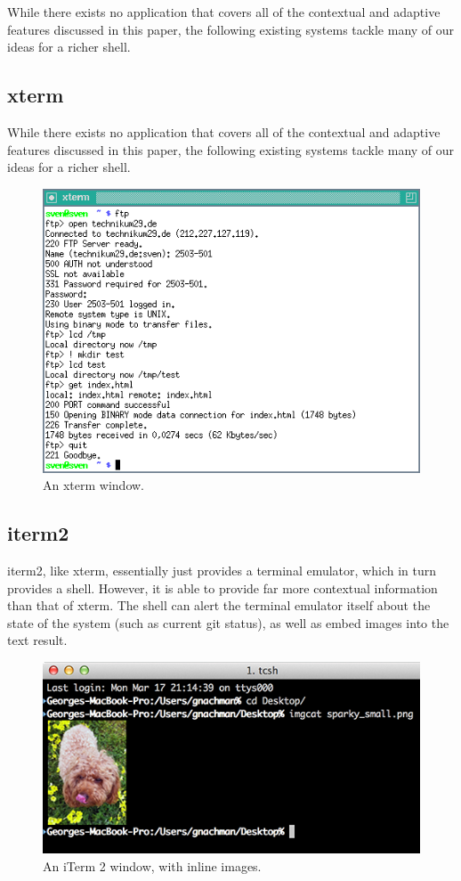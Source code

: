 While there exists no application that covers all of the contextual and adaptive
features discussed in this paper, the following existing systems tackle many of
our ideas for a richer shell.

\subsection{xterm}
While there exists no application that covers all of the contextual and adaptive
features discussed in this paper, the following existing systems tackle many of
our ideas for a richer shell.
\begin{figure}[h]
  \centering
  \includegraphics[width=0.8\linewidth]{figures/xterm.png}
  \caption{An xterm window.}
  \label{fig:xterm}
\end{figure}

\subsection{iterm2}
iterm2, like xterm, essentially just provides a terminal emulator, which in turn
provides a shell. However, it is able to provide far more contextual information
than that of xterm. The shell can alert the terminal emulator itself about the
state of the system (such as current git status), as well as embed images into
the text result.
\begin{figure}[h]
  \centering
  \includegraphics[width=0.8\linewidth]{figures/iterm2.png}
  \caption{An iTerm 2 window, with inline images.}
  \label{fig:iterm}
\end{figure}


